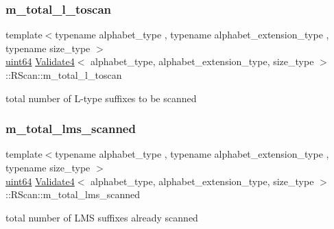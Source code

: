 \mbox{\label{struct_validate4_1_1_r_scan_a4cc3c1365b0089fe9d7740fed39dd0a7}} 
\subsubsection{\texorpdfstring{m\+\_\+total\+\_\+l\+\_\+toscan}{m\_total\_l\_toscan}}
{\footnotesize\ttfamily template$<$typename alphabet\+\_\+type , typename alphabet\+\_\+extension\+\_\+type , typename size\+\_\+type $>$ \\
\hyperlink{types_8h_a60e8696a4678cd348e991a1f172e53f7}{uint64} \hyperlink{class_validate4}{Validate4}$<$ alphabet\+\_\+type, alphabet\+\_\+extension\+\_\+type, size\+\_\+type $>$\+::R\+Scan\+::m\+\_\+total\+\_\+l\+\_\+toscan\hspace{0.3cm}{\ttfamily [private]}}



total number of L-\/type suffixes to be scanned 

\mbox{\label{struct_validate4_1_1_r_scan_a6451f758af2853be9d7aafc978001493}} 
\subsubsection{\texorpdfstring{m\+\_\+total\+\_\+lms\+\_\+scanned}{m\_total\_lms\_scanned}}
{\footnotesize\ttfamily template$<$typename alphabet\+\_\+type , typename alphabet\+\_\+extension\+\_\+type , typename size\+\_\+type $>$ \\
\hyperlink{types_8h_a60e8696a4678cd348e991a1f172e53f7}{uint64} \hyperlink{class_validate4}{Validate4}$<$ alphabet\+\_\+type, alphabet\+\_\+extension\+\_\+type, size\+\_\+type $>$\+::R\+Scan\+::m\+\_\+total\+\_\+lms\+\_\+scanned\hspace{0.3cm}{\ttfamily [private]}}



total number of L\+MS suffixes already scanned 

